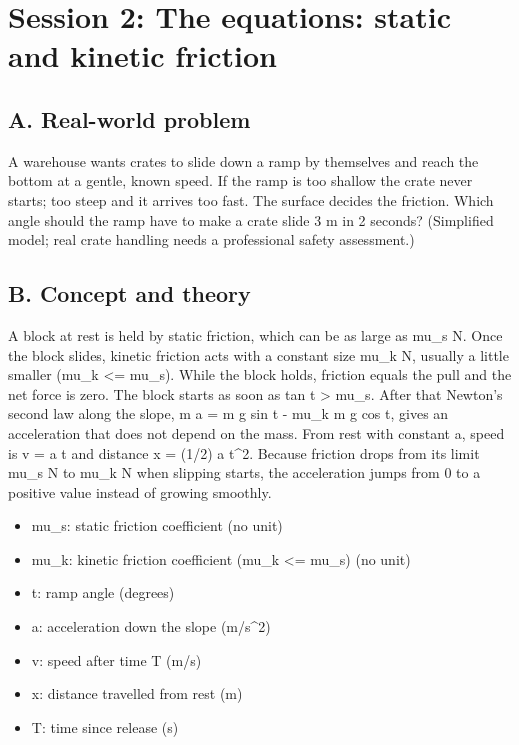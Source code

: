 \documentclass[11pt,a4paper]{article}
\begin{document}
\section{Session 2: The equations: static and kinetic friction}

\subsection*{A. Real-world problem}
A warehouse wants crates to slide down a ramp by themselves and reach the bottom at a gentle, known speed. If the ramp is too shallow the crate never starts; too steep and it arrives too fast. The surface decides the friction. Which angle should the ramp have to make a crate slide 3 m in 2 seconds? (Simplified model; real crate handling needs a professional safety assessment.)

\subsection*{B. Concept and theory}
A block at rest is held by static friction, which can be as large as mu\_s N. Once the block slides, kinetic friction acts with a constant size mu\_k N, usually a little smaller (mu\_k \textless{}= mu\_s). While the block holds, friction equals the pull and the net force is zero. The block starts as soon as tan t \textgreater{} mu\_s. After that Newton's second law along the slope, m a = m g sin t - mu\_k m g cos t, gives an acceleration that does not depend on the mass. From rest with constant a, speed is v = a t and distance x = (1/2) a t\textasciicircum{}2. Because friction drops from its limit mu\_s N to mu\_k N when slipping starts, the acceleration jumps from 0 to a positive value instead of growing smoothly.

\begin{itemize}[nosep]
\item mu\_s: static friction coefficient (no unit)
\item mu\_k: kinetic friction coefficient (mu\_k \textless{}= mu\_s) (no unit)
\item t: ramp angle (degrees)
\item a: acceleration down the slope (m/s\textasciicircum{}2)
\item v: speed after time T (m/s)
\item x: distance travelled from rest (m)
\item T: time since release (s)
\end{itemize}
\end{document}
